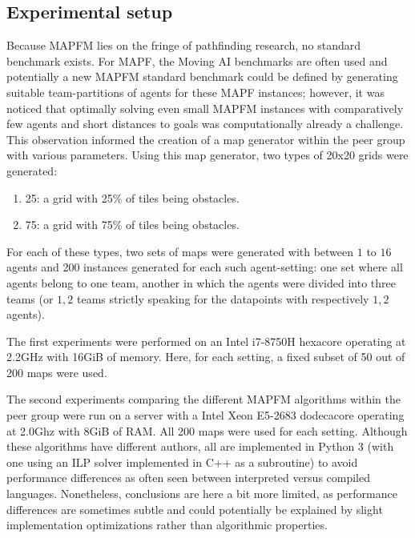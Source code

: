 \documentclass[english,10pt]{article}
\begin{document}
	\subsection{Experimental setup}
	Because MAPFM lies on the fringe of pathfinding research, no standard benchmark exists. For MAPF, the Moving AI benchmarks \cite{sturtevant2012} are often used and potentially a new MAPFM standard benchmark could be defined by generating suitable team-partitions of agents for these MAPF instances; however, it was noticed that optimally solving even small MAPFM instances with comparatively few agents and short distances to goals was computationally already a challenge. This observation informed the creation of a map generator within the peer group with various parameters. Using this map generator, two types of 20x20 grids were generated:
	\begin{enumerate}
		\item 25: a grid with 25\% of tiles being obstacles.
		\item 75: a grid with 75\% of tiles being obstacles. 
	\end{enumerate}
	For each of these types, two sets of maps were generated with between $1$ to $16$ agents and 200 instances generated for each such agent-setting: one set where all agents belong to one team, another in which the agents were divided into three teams (or $1,2$ teams strictly speaking for the datapoints with respectively $1,2$ agents). 
	
	The first experiments were performed on an Intel i7-8750H hexacore operating at 2.2GHz with 16GiB of memory. Here, for each setting, a fixed subset of 50 out of 200 maps were used.
	
	The second experiments comparing the different MAPFM algorithms within the peer group were run on a server with a Intel Xeon E5-2683 dodecacore operating at 2.0Ghz with 8GiB of RAM. All 200 maps were used for each setting. Although these algorithms have different authors, all are implemented in Python 3 (with one using an ILP solver implemented in C++ as a subroutine) to avoid performance differences as often seen between interpreted versus compiled languages. Nonetheless, conclusions are here a bit more limited, as performance differences are sometimes subtle and could potentially be explained by slight implementation optimizations rather than algorithmic properties.
	
\end{document}
